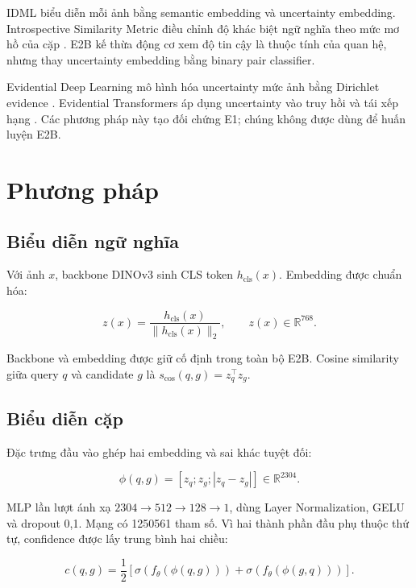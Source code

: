 \documentclass[11pt,a4paper]{article}
\begin{document}
IDML biểu diễn mỗi ảnh bằng semantic embedding và uncertainty embedding. Introspective Similarity Metric điều chỉnh độ khác biệt ngữ nghĩa theo mức mơ hồ của cặp \cite{wang2023idml}. E2B kế thừa động cơ xem độ tin cậy là thuộc tính của quan hệ, nhưng thay uncertainty embedding bằng binary pair classifier.

Evidential Deep Learning mô hình hóa uncertainty mức ảnh bằng Dirichlet evidence \cite{sensoy2018evidential}. Evidential Transformers áp dụng uncertainty vào truy hồi và tái xếp hạng \cite{dordevic2024evidential}. Các phương pháp này tạo đối chứng E1; chúng không được dùng để huấn luyện E2B.

\section{Phương pháp}
\subsection{Biểu diễn ngữ nghĩa}
Với ảnh $x$, backbone DINOv3 sinh CLS token $h_{\mathrm{cls}}(x)$. Embedding được chuẩn hóa:

\begin{equation}
z(x)=\frac{h_{\mathrm{cls}}(x)}
{\lVert h_{\mathrm{cls}}(x)\rVert_2},
\qquad z(x)\in\mathbb{R}^{768}.
\end{equation}

Backbone và embedding được giữ cố định trong toàn bộ E2B. Cosine similarity giữa query $q$ và candidate $g$ là $s_{\cos}(q,g)=z_q^\top z_g$.

\subsection{Biểu diễn cặp}
Đặc trưng đầu vào ghép hai embedding và sai khác tuyệt đối:

\begin{equation}
\phi(q,g)=[z_q;z_g;|z_q-z_g|]\in\mathbb{R}^{2304}.
\end{equation}

MLP lần lượt ánh xạ $2304\rightarrow512\rightarrow128\rightarrow1$, dùng Layer Normalization, GELU và dropout 0,1. Mạng có \num{1250561} tham số. Vì hai thành phần đầu phụ thuộc thứ tự, confidence được lấy trung bình hai chiều:

\begin{equation}
c(q,g)=\frac{1}{2}\left[
\sigma(f_\theta(\phi(q,g)))+
\sigma(f_\theta(\phi(g,q)))
\right].
\end{equation}
\end{document}
